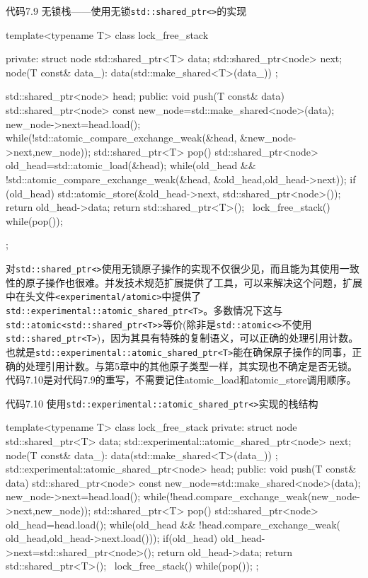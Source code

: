 代码7.9 无锁栈——使用无锁\texttt{std::shared\_ptr<>}的实现

\begin{cpp}
template<typename T>
class lock_free_stack
{
private:
  struct node
  {
    std::shared_ptr<T> data;
    std::shared_ptr<node> next;
    node(T const& data_):
      data(std::make_shared<T>(data_))
    {}
  };

  std::shared_ptr<node> head;
public:
  void push(T const& data)
  {
    std::shared_ptr<node> const new_node=std::make_shared<node>(data);
    new_node->next=head.load();
    while(!std::atomic_compare_exchange_weak(&head,
        &new_node->next,new_node));
  }
  std::shared_ptr<T> pop()
  {
    std::shared_ptr<node> old_head=std::atomic_load(&head);
    while(old_head && !std::atomic_compare_exchange_weak(&head,
        &old_head,old_head->next));
    if (old_head){
      std::atomic_store(&old_head->next, std::shared_ptr<node>());
      return old_head->data;
    }
    return std::shared_ptr<T>();
  }
  ~lock_free_stack(){
    while(pop());
  }
};
\end{cpp}

对\texttt{std::shared\_ptr<>}使用无锁原子操作的实现不仅很少见，而且能为其使用一致性的原子操作也很难。并发技术规范扩展提供了工具，可以来解决这个问题，扩展中在头文件\texttt{<experimental/atomic>}中提供了\texttt{std::experimental::atomic\_shared\_ptr<T>}。多数情况下这与\texttt{std::atomic<std::shared\_ptr<T>>}等价(除非是\texttt{std::atomic<>}不使用\texttt{std::shared\_ptr<T>})，因为其具有特殊的复制语义，可以正确的处理引用计数。也就是\texttt{std::experimental::atomic\_shared\_ptr<T>}能在确保原子操作的同事，正确的处理引用计数。与第5章中的其他原子类型一样，其实现也不确定是否无锁。代码7.10是对代码7.9的重写，不需要记住atomic\_load和atomic\_store调用顺序。

代码7.10 使用\texttt{std::experimental::atomic\_shared\_ptr<>}实现的栈结构

\begin{cpp}
template<typename T>
class lock_free_stack
{
private:
  struct node
  {
    std::shared_ptr<T> data;
    std::experimental::atomic_shared_ptr<node> next;
    node(T const& data_):
      data(std::make_shared<T>(data_))
    {}
  };
  std::experimental::atomic_shared_ptr<node> head;
public:
  void push(T const& data)
  {
    std::shared_ptr<node> const new_node=std::make_shared<node>(data);
    new_node->next=head.load();
    while(!head.compare_exchange_weak(new_node->next,new_node));
  }
  std::shared_ptr<T> pop()
  {
    std::shared_ptr<node> old_head=head.load();
    while(old_head && !head.compare_exchange_weak(
      old_head,old_head->next.load()));
    if(old_head) {
      old_head->next=std::shared_ptr<node>();
      return old_head->data;
    }
    return std::shared_ptr<T>();
  }
  ~lock_free_stack(){
    while(pop());
  }
};
\end{cpp}

